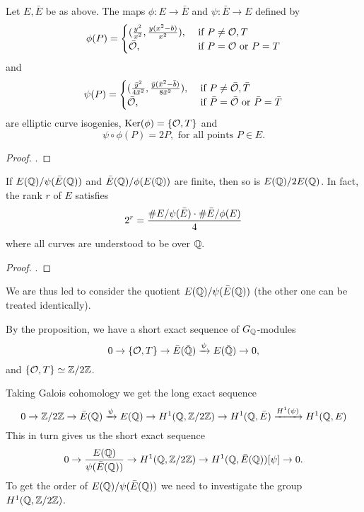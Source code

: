 \documentclass[12pt, a4paper]{report}
\begin{document}
\begin{prop}
  Let $E, \bar{E}$ be as above. The maps $\phi : E \rightarrow \bar{E}$ and
  $\psi : \bar{E} \rightarrow E$ defined by
  \[\phi(P) =
    \begin{cases}
      (\frac{y^2}{x^2}, \frac{y(x^2-b)}{x^2}), & \text{ if } P \neq {\mathcal O}, T \\
      \bar{{\mathcal O}}, & \text{ if } P = {\mathcal O} \text{ or } P = T
    \end{cases}\]
  and
  \[\psi(P) =
    \begin{cases}
      (\frac{\bar{y}^2}{4\bar{x}^2}, \frac{\bar{y}(\bar{x}^2-\bar{b})}{8\bar{x}^2}),
      & \text{ if } P \neq \bar{{\mathcal O}}, \bar{T} \\
      \bar{{\mathcal O}}, & \text{ if } \bar{P} = \bar{{\mathcal O}} \text{ or } \bar{P} = \bar{T}
    \end{cases}\]
  are elliptic curve isogenies, $\text{Ker}(\phi) = \{{\mathcal O}, T\}$ and
  \[ \psi \circ \phi (P) = 2P , \text{ for all points } P \in E.\]
\end{prop}
\begin{proof}
  \cite[See][Chapter 4, page 79]{rational}.
\end{proof}

\begin{lemma} \label{lemma:rankformula}
  If $E({\mathbb Q}) / \psi(\bar{E}({\mathbb Q}))$ and $\bar{E}({\mathbb Q}) / \phi(E({\mathbb Q}))$ 
  are finite, then so is $E({\mathbb Q})/2E({\mathbb Q})$.
  In fact, the rank $r$ of $E$ satisfies
  \[2^r = \frac{\#E/\psi(\bar{E}) \cdot \#\bar{E}/\phi(E)}{4}\]
  where all curves are understood to be over ${\mathbb Q}.$
\end{lemma}
\begin{proof}
  \cite[See][Chapter 4, page 83]{rational}.
\end{proof}

We are thus led to consider the quotient $E({\mathbb Q}) / \psi(\bar{E}({\mathbb Q}))$ (the
other one can be treated identically).

By the proposition, we have a short exact sequence of $G_{{\mathbb Q}}$-modules
\[ 0 \rightarrow \{{\mathcal O}, T\} \rightarrow \bar{E}(\bar{{\mathbb Q}}) \xrightarrow[]{\psi}
  E(\bar{{\mathbb Q}})
  \rightarrow 0,\]
and $\{{\mathcal O}, T\} \simeq {\mathbb Z}/2{\mathbb Z}$.

Taking Galois cohomology we get the long exact sequence
\[ 0 \rightarrow {\mathbb Z} / 2{\mathbb Z} \rightarrow \bar{E}({\mathbb Q}) \xrightarrow[]{\psi} E({\mathbb Q})
  \rightarrow H^1({\mathbb Q}, {\mathbb Z}/2{\mathbb Z}) \rightarrow H^1({\mathbb Q}, \bar{E}) \xrightarrow{H^1(\psi)}
  H^1({\mathbb Q}, E)\]
This in turn gives us the short exact sequence
\begin{equation} \label{exact}
  0 \rightarrow \frac{E({\mathbb Q})}{\psi(\bar{E} ({\mathbb Q}))} \rightarrow
  H^1({\mathbb Q}, {\mathbb Z} / 2{\mathbb Z}) \rightarrow H^1({\mathbb Q}, \bar{E}({\mathbb Q}))[\psi] \rightarrow 0.
\end{equation}
To get the order of $E({\mathbb Q}) / \psi(\bar{E}({\mathbb Q}))$ we need to investigate the group
$H^1({\mathbb Q}, {\mathbb Z}/2{\mathbb Z})$.
\end{document}
